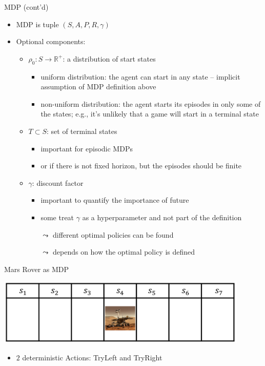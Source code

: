 \documentclass[aspectratio=169]{../latex_main/tntbeamer}  %
\begin{document}
\begin{frame}[c]{MDP (cont'd)}
	
	\begin{itemize}
		\item MDP is tuple $(S,A,P, R, \gamma)$
		\item Optional components:
		\begin{itemize}
			\item $\rho_0: S \to \mathbb{R}^+$: a distribution of start states
			\begin{itemize}
				\item uniform distribution: the agent can start in any state -- implicit assumption of MDP definition above
				\item non-uniform distribution: the agent starts its episodes in only some of the states; e.g., it's unlikely that a game will start in a terminal state
			\end{itemize}
		\pause
			\item $T \subset S$: set of terminal states
			\begin{itemize}
				\item important for episodic MDPs 
				\item or if there is not fixed horizon, but the episodes should be finite
			\end{itemize}
		\pause
			\item $\gamma$: discount factor
			\begin{itemize}
				\item important to quantify the importance of future 
				\smallskip
				\item some treat $\gamma$ as a hyperparameter and not part of the definition
				\item[$\leadsto$] different optimal policies can be found
				\item[$\leadsto$] depends on how the optimal policy is defined
			\end{itemize}
		\end{itemize}
	\end{itemize}
	
\end{frame}
\begin{frame}[c]{Mars Rover as MDP}

\begin{center}
	\includegraphics[width=0.9\textwidth]{images/mars_rover.png}
\end{center}

\begin{itemize}
	\item $2$ deterministic Actions: TryLeft and TryRight
\end{itemize}



\end{frame}
\end{document}
